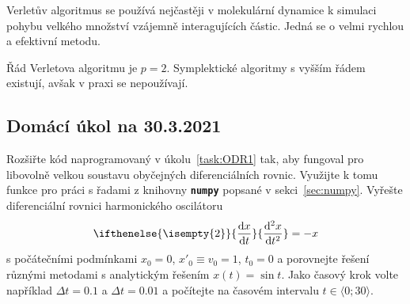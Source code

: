 \documentclass[a4paper,11pt,twoside]{article}
\renewcommand{\d}{\mathrm{d}}
\newcommand{\derivative}[3][]{\ifthenelse{\isempty{#1}}	    %
	{\frac{\d{#2}}{\d{#3}}}
	{\frac{\d^{#1}{#2}}{\d{#3}^{#1}}}
}
\def\file#1{\textnormal{\textbf{\texttt{#1}}}}
\theoremstyle{red}
\theoremstyle{green}
\begin{document}
    Verletův algoritmus se používá nejčastěji v molekulární dynamice k simulaci pohybu velkého množství vzájemně interagujících částic.
    Jedná se o velmi rychlou a efektivní metodu.

    Řád Verletova algoritmu je $p=2$. 
    Symplektické algoritmy s vyšším řádem existují, avšak v praxi se nepoužívají.

\newpage
{\color{red}\subsection{Domácí úkol na 30.3.2021}}
\begin{task}
    Rozšiřte kód naprogramovaný v úkolu~\ref{task:ODR1} tak, aby fungoval pro libovolně velkou soustavu obyčejných diferenciálních rovnic.
    Využijte k tomu funkce pro práci s řadami z knihovny \file{numpy} popsané v sekci~\ref{sec:numpy}.
    Vyřešte diferenciální rovnici harmonického oscilátoru 
    \begin{equation}\label{eq:HO}
        \derivative[2]{x}{t}=-x
    \end{equation}
    s počátečními podmínkami $x_{0}=0$, $x'_{0}\equiv v_{0}=1$, $t_{0}=0$ a porovnejte řešení různými metodami s analytickým řešením $x(t)=\sin t$.
    Jako časový krok volte například $\Delta t=0.1$ a $\Delta t=0.01$ a počítejte na časovém intervalu $t\in\langle 0;30\rangle$.
\end{task}    
\end{document}
